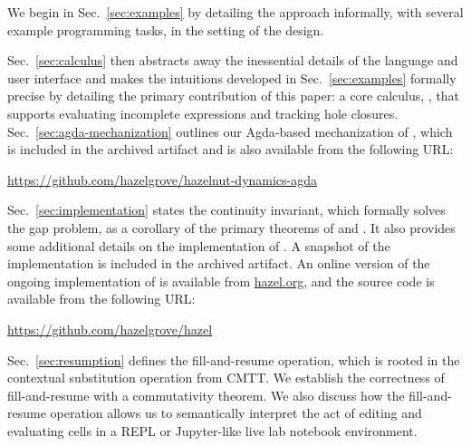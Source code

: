 \vspace{-2px}

\newcommand{\contribution}[2]{\paragraph{#1. #2}} 


We begin in Sec.~\ref{sec:examples} by detailing the approach informally, with several example programming tasks, in the setting of the \Hazel design. 

Sec.~\ref{sec:calculus} then abstracts away the inessential details of the language and user interface and makes the  intuitions developed in Sec.~\ref{sec:examples} formally precise by detailing the primary contribution of this paper: a core calculus, \HazelnutLive, that supports evaluating incomplete expressions and tracking hole closures. 
Sec.~\ref{sec:agda-mechanization} outlines our Agda-based mechanization of \HazelnutLive, which is included in the archived artifact and is also available from the following URL: 

\begin{center}
\url{https://github.com/hazelgrove/hazelnut-dynamics-agda}
\end{center}

\noindent
Sec.~\ref{sec:implementation} states the continuity invariant, which formally solves the gap problem, as a corollary of the primary theorems of \Hazelnut and \HazelnutLive. It also provides some additional details on the implementation of \Hazel. A snapshot of the implementation is included in the archived artifact. An online version of the ongoing implementation of \Hazel is available from \url{hazel.org}, and the source code is available from the following URL:

\begin{center}
\url{https://github.com/hazelgrove/hazel}
\end{center}

Sec.~\ref{sec:resumption} defines the fill-and-resume operation, which is rooted in the contextual substitution operation from CMTT. We establish the correctness of fill-and-resume with a commutativity theorem. We also discuss how the fill-and-resume operation allows us to semantically interpret the act of editing and evaluating cells in a REPL or Jupyter-like live lab notebook environment.

